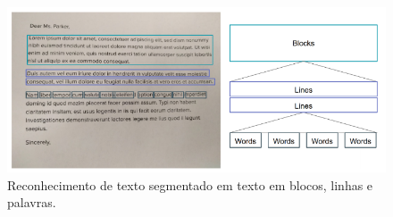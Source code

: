  \begin{figure}[h]
	\centering
	
	\includegraphics[width=1.0\textwidth]{Imagens/estruturatexto} 
	\caption[Reconhecimento de texto segmentado em texto em blocos, linhas e palavras.]{Reconhecimento de texto segmentado em texto em blocos, linhas e palavras.}
	\label{fig:estruturatexto}
\end{figure}
